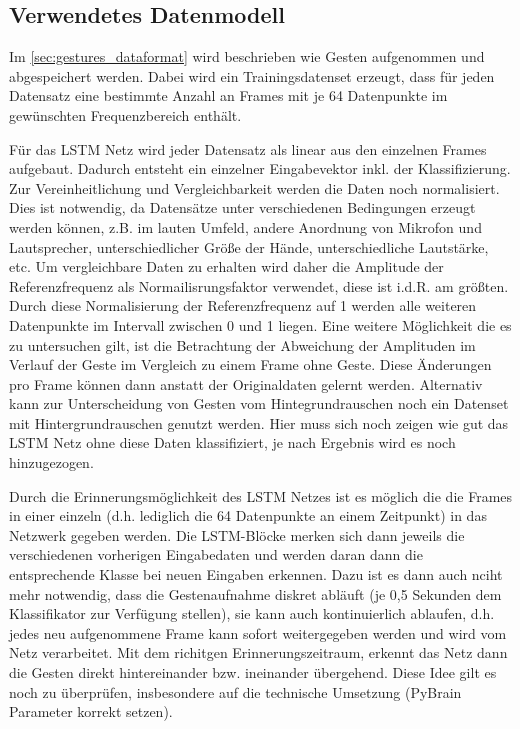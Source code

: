 \subsection{Verwendetes Datenmodell}
\label{sec:lstm_data}

Im \autoref{sec:gestures_dataformat} wird beschrieben wie Gesten aufgenommen und
abgespeichert werden. Dabei wird ein Trainingsdatenset erzeugt, dass für
jeden Datensatz eine bestimmte Anzahl an Frames mit je 64 Datenpunkte im
gewünschten Frequenzbereich enthält. 

Für das \ac{LSTM} Netz wird jeder Datensatz als linear aus den einzelnen Frames
aufgebaut. Dadurch entsteht ein einzelner Eingabevektor inkl. der
Klassifizierung. Zur Vereinheitlichung und Vergleichbarkeit werden die Daten
noch normalisiert.
Dies ist notwendig, da Datensätze unter verschiedenen Bedingungen erzeugt werden
können, z.B. im lauten Umfeld, andere Anordnung von Mikrofon und Lautsprecher,
unterschiedlicher Größe der Hände, unterschiedliche Lautstärke, etc. Um
vergleichbare Daten zu erhalten wird daher die Amplitude der Referenzfrequenz
als Normailisrungsfaktor verwendet, diese ist i.d.R. am größten. Durch diese
Normalisierung der Referenzfrequenz auf 1 werden alle weiteren Datenpunkte im
Intervall zwischen 0 und 1 liegen. Eine weitere Möglichkeit die es zu
untersuchen gilt, ist die Betrachtung der Abweichung der Amplituden im Verlauf
der Geste im Vergleich zu einem Frame ohne Geste. Diese Änderungen pro Frame
können dann anstatt der Originaldaten gelernt werden. Alternativ kann zur
Unterscheidung von Gesten vom Hintegrundrauschen noch ein Datenset mit
Hintergrundrauschen genutzt werden. Hier muss sich noch zeigen wie gut das
\ac{LSTM} Netz ohne diese Daten klassifiziert, je nach Ergebnis wird es noch
hinzugezogen. 

Durch die Erinnerungsmöglichkeit des \ac{LSTM} Netzes ist es möglich die die
Frames in einer einzeln (d.h. lediglich die 64 Datenpunkte an einem Zeitpunkt)
in das Netzwerk gegeben werden. Die \ac{LSTM}-Blöcke merken sich dann jeweils
die verschiedenen vorherigen Eingabedaten und werden daran dann die
entsprechende Klasse bei neuen Eingaben erkennen. Dazu ist es dann auch nciht
mehr notwendig, dass die Gestenaufnahme diskret abläuft (je 0,5 Sekunden dem
Klassifikator zur Verfügung stellen), sie kann auch kontinuierlich ablaufen,
d.h. jedes neu aufgenommene Frame kann sofort weitergegeben werden und wird vom
Netz verarbeitet. Mit dem richitgen Erinnerungszeitraum, erkennt das Netz dann
die Gesten direkt hintereinander bzw. ineinander übergehend. Diese Idee gilt es
noch zu überprüfen, insbesondere auf die technische Umsetzung (PyBrain
Parameter korrekt setzen).




\nocite{GERS2001,WIKI2013,Schmidhuber2013,LSTM1,Nerbonne1}
